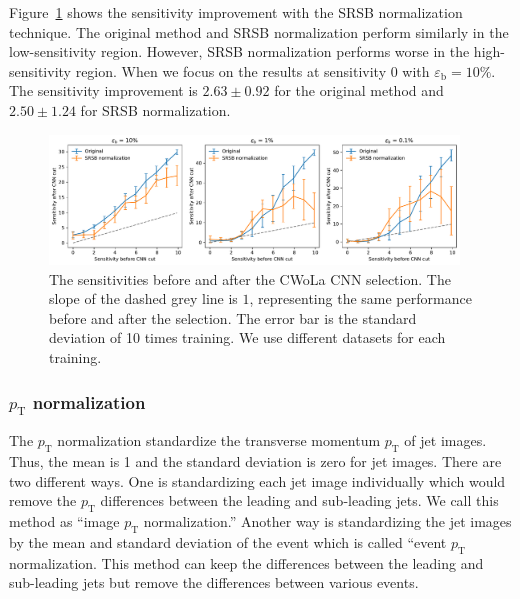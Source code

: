 \documentclass[12pt]{article}
\begin{document}
			 Figure~\ref{fig:sensitivity_improvement_background_subtraction_origin_srsb_normalized} shows the sensitivity improvement with the SRSB normalization technique. The original method and SRSB normalization perform similarly in the low-sensitivity region. However, SRSB normalization performs worse in the high-sensitivity region. When we focus on the results at sensitivity 0 with $\varepsilon_{\text{b}} = 10\%$. The sensitivity improvement is $2.63 \pm 0.92$ for the original method and $2.50 \pm 1.24$ for SRSB normalization. 
			\begin{figure}[htpb]
				\centering
				\includegraphics[width=0.97\textwidth]{HVmodel_sensitivity_improvement_origin_SRSB_normalied.pdf}
				\caption{The sensitivities before and after the CWoLa CNN selection. The slope of the dashed grey line is $1$, representing the same performance before and after the selection. The error bar is the standard deviation of 10 times training. We use different datasets for each training.}
				\label{fig:sensitivity_improvement_background_subtraction_origin_srsb_normalized}
			\end{figure}
		\subsubsection{\texorpdfstring{$p_{\mathrm{T}}$}{pT} normalization}%
		\label{subs:pt_normalization}
			The $p_{\text{T}}$ normalization standardize the transverse momentum $p_{\text{T}}$ of jet images. Thus, the mean is 1 and the standard deviation is zero for jet images. There are two different ways. One is standardizing each jet image individually which would remove the $p_{\text{T}}$ differences between the leading and sub-leading jets. We call this method as ``image $p_{\text{T}}$ normalization.'' Another way is standardizing the jet images by the mean and standard deviation of the event which is called ``event $p_{\text{T}}$ normalization. This method can keep the differences between the leading and sub-leading jets but remove the differences between various events.
\end{document}
